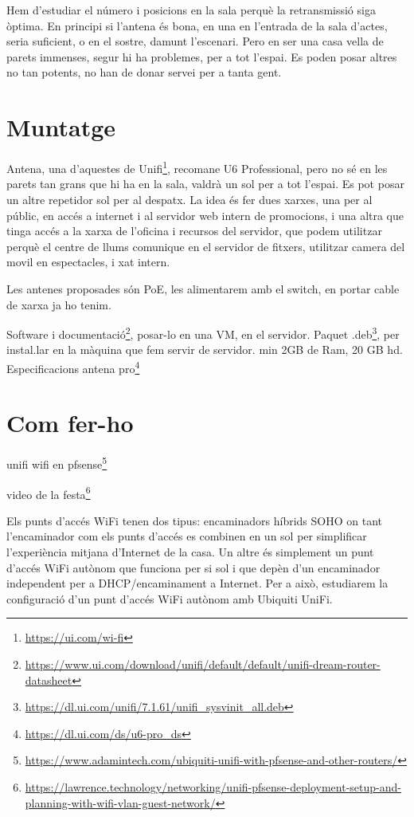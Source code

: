 \documentclass[
  10pt,
]{krantz}
\DeclareRobustCommand{\href}[2]{#2\footnote{\url{#1}}}
\begin{document}
Hem d'estudiar el número i posicions en la sala perquè la retransmissió siga òptima. En principi si l'antena és bona, en una en l'entrada de la sala d'actes, seria suficient, o en el sostre, damunt l'escenari. Pero en ser una casa vella de parets immenses, segur hi ha problemes, per a tot l'espai. Es poden posar altres no tan potents, no han de donar servei per a tanta gent.

\hypertarget{muntatge-1}{%
\section{Muntatge}\label{muntatge-1}}

Antena, una d'aquestes de \href{https://ui.com/wi-fi}{Unifi}, recomane U6 Professional, pero no sé en les parets tan grans que hi ha en la sala, valdrà un sol per a tot l'espai. Es pot posar un altre repetidor sol per al despatx. La idea és fer dues xarxes, una per al públic, en accés a internet i al servidor web intern de promocions, i una altra que tinga accés a la xarxa de l'oficina i recursos del servidor, que podem utilitzar perquè el centre de llums comunique en el servidor de fitxers, utilitzar camera del movil en espectacles, i xat intern.

Les antenes proposades són PoE, les alimentarem amb el switch, en portar cable de xarxa ja ho tenim.

\href{https://www.ui.com/download/unifi/default/default/unifi-dream-router-datasheet}{Software i documentació}, posar-lo en una VM, en el servidor. \href{https://dl.ui.com/unifi/7.1.61/unifi_sysvinit_all.deb}{Paquet .deb}, per instal.lar en la màquina que fem servir de servidor. min 2GB de Ram, 20 GB hd. \href{https://dl.ui.com/ds/u6-pro_ds}{Especificacions antena pro}

\hypertarget{com-fer-ho}{%
\section{Com fer-ho}\label{com-fer-ho}}

\href{https://www.adamintech.com/ubiquiti-unifi-with-pfsense-and-other-routers/}{unifi wifi en pfsense}

\href{https://lawrence.technology/networking/unifi-pfsense-deployment-setup-and-planning-with-wifi-vlan-guest-network/}{video de la festa}

Els punts d'accés WiFi tenen dos tipus: encaminadors híbrids SOHO on tant l'encaminador com els punts d'accés es combinen en un sol per simplificar l'experiència mitjana d'Internet de la casa. Un altre és simplement un punt d'accés WiFi autònom que funciona per si sol i que depèn d'un encaminador independent per a DHCP/encaminament a Internet. Per a això, estudiarem la configuració d'un punt d'accés WiFi autònom amb Ubiquiti UniFi.
\end{document}
